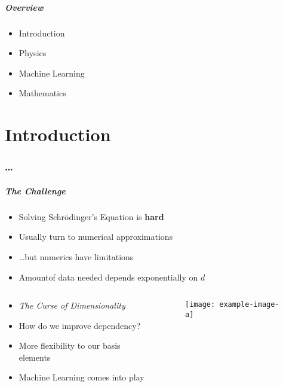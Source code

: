 \begin{frame}
    \frametitle{Overview}
    \begin{itemize}[<+>]
        \item {Introduction}
        \item {Physics}
        \item {Machine Learning}
        \item {Mathematics}
    \end{itemize}
\end{frame}
\part[Part slide]{Introduction}
\makepart%

\section{\ldots}

\begin{frame}[t,label=intro]
\frametitle{The Challenge}

\begin{itemize}[<+->]
    \setlength\itemsep{.8em}
    \item Solving Schrödinger's Equation is \textbf{hard}
    \item Usually turn to numerical approximations
    \item \ldots but numerics have limitations
    \item Amountof data needed depends exponentially on $d$
\end{itemize}

\begin{columns}
    \begin{column}[t]{0.48\textwidth}
        \begin{itemize}[<+->]
            \setlength\itemsep{.8em}
            \item \textit{The Curse of Dimensionality}
            \item How do we improve dependency?
            \item More flexibility to our basis elements 
            \item Machine Learning comes into play
        \end{itemize}
    \end{column}
    \begin{column}[t]{0.48\textwidth}
        \begin{figure}
            \texttt{[image: example-image-a]}
        \end{figure}
    \end{column}
\end{columns}


\end{frame}

